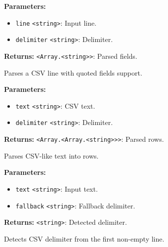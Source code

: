 \documentclass[12pt,a4paper]{article}
\begin{document}
\noindent \textbf{Parameters:}
\begin{itemize}
  \item \texttt{line} \texttt{<string>}: Input line.
  \item \texttt{delimiter} \texttt{<string>}: Delimiter.
\end{itemize}

\noindent \textbf{Returns:} \texttt{<Array.<string>>}: Parsed fields.

\noindent Parses a CSV line with quoted fields support.

\vspace{5mm}
\noindent {}


\noindent \textbf{Parameters:}
\begin{itemize}
  \item \texttt{text} \texttt{<string>}: CSV text.
  \item \texttt{delimiter} \texttt{<string>}: Delimiter.
\end{itemize}

\noindent \textbf{Returns:} \texttt{<Array.<Array.<string>>>}: Parsed rows.

\noindent Parses CSV-like text into rows.

\vspace{5mm}
\noindent {}


\noindent \textbf{Parameters:}
\begin{itemize}
  \item \texttt{text} \texttt{<string>}: Input text.
  \item \texttt{fallback} \texttt{<string>}: Fallback delimiter.
\end{itemize}

\noindent \textbf{Returns:} \texttt{<string>}: Detected delimiter.

\noindent Detects CSV delimiter from the first non-empty line.

\vspace{5mm}
\noindent {}
\end{document}
